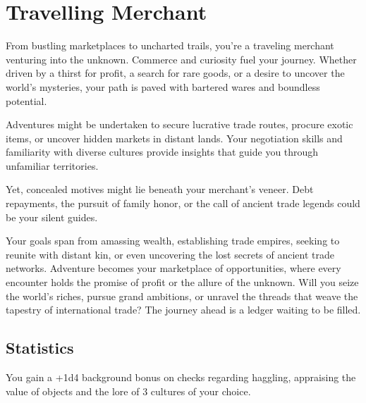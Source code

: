 \section{Travelling Merchant}\label{background:travellingMerchant}
From bustling marketplaces to uncharted trails, you're a traveling merchant venturing into the unknown.
Commerce and curiosity fuel your journey.
Whether driven by a thirst for profit, a search for rare goods, or a desire to uncover the world's mysteries, your path is paved with bartered wares and boundless potential.

Adventures might be undertaken to secure lucrative trade routes, procure exotic items, or uncover hidden markets in distant lands.
Your negotiation skills and familiarity with diverse cultures provide insights that guide you through unfamiliar territories.

Yet, concealed motives might lie beneath your merchant's veneer.
Debt repayments, the pursuit of family honor, or the call of ancient trade legends could be your silent guides.

Your goals span from amassing wealth, establishing trade empires, seeking to reunite with distant kin, or even uncovering the lost secrets of ancient trade networks.
Adventure becomes your marketplace of opportunities, where every encounter holds the promise of profit or the allure of the unknown.
Will you seize the world's riches, pursue grand ambitions, or unravel the threads that weave the tapestry of international trade?
The journey ahead is a ledger waiting to be filled.

\subsection{Statistics}
You gain a +1d4 background bonus on checks regarding haggling, appraising the value of objects and the lore of 3 cultures of your choice.
